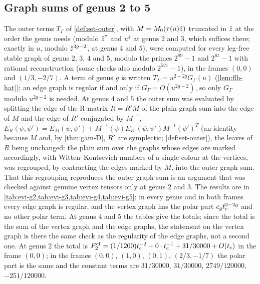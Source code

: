 \subsection{Graph sums of genus 2 to 5}
\label{sec:evi-graphs}

The outer terms $T_\Gamma$ of \cref{def:set-outer}, with $M=M_{0}(\tau(u)\hat{z})$ truncated in $\hat{z}$ at the order the genus needs (modulo $\hat{z}^7$ and $u^4$ at genus $2$ and $3$, which suffices there; exactly in $u$, modulo $\hat{z}^{3g-2}$, at genus $4$ and $5$), were computed for every leg-free stable graph of genus $2$, $3$, $4$ and $5$, modulo the primes $2^{89}-1$ and $2^{61}-1$ with rational reconstruction (some checks also modulo $2^{521}-1$), in the frames $(0,0)$ and $(1/3,-2/7)$. A term of genus $g$ is written $T_\Gamma=u^{2-2g}G_\Gamma(u)$ (\cref{lem:flh-hat}); an edge graph is regular if and only if $G_\Gamma=O(u^{2g-2})$, so only $G_\Gamma$ modulo $u^{2g-2}$ is needed. At genus $4$ and $5$ the outer sum was evaluated by splitting the edge of the R-matrix $R=R'M$ of the plain graph sum into the edge of $M$ and the edge of $R'$ conjugated by $M^{-1}$, $E_R(\psi,\psi')=E_M(\psi,\psi')+M^{-1}(\psi)E_{R'}(\psi,\psi')M^{-1}(\psi')^T$ (an identity because $M$ and, by \cref{thm:gam-D}, $R'$ are symplectic; \cref{def:set-outer}), the leaves of $R$ being unchanged: the plain sum over the graphs whose edges are marked accordingly, with Witten--Kontsevich numbers of a single colour at the vertices, was regrouped, by contracting the edges marked by $M$, into the outer graph sum. That this regrouping reproduces the outer graph sum is an argument that was checked against genuine vertex tensors only at genus $2$ and $3$. The results are in \cref{tab:evi-g2,tab:evi-g3,tab:evi-g4,tab:evi-g5}: in every genus and in both frames every edge graph is regular, and the vertex graph has the polar part $c_gt_{\mathrm{c}}^{2-2g}$ and no other polar term. At genus $4$ and $5$ the tables give the totals; since the total is the sum of the vertex graph and the edge graphs, the statement on the vertex graph is there the same check as the regularity of the edge graphs, not a second one. At genus $2$ the total is $F_2^{\mathrm{cf}}=(1/1200)t_{\mathrm{c}}^{-2}+0\cdot t_{\mathrm{c}}^{-1}+31/30000+O(t_{\mathrm{c}})$ in the frame $(0,0)$; in the frames $(0,0)$, $(1,0)$, $(0,1)$, $(2/3,-1/7)$ the polar part is the same and the constant terms are $31/30000$, $31/30000$, $2749/120000$, $-251/120000$.

